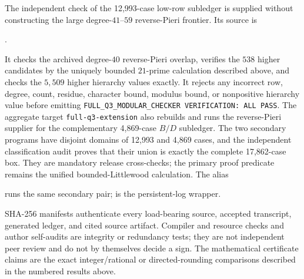 \documentclass[11pt,reqno]{amsart}
\theoremstyle{plain}
\theoremstyle{definition}
\begin{document}
The independent check of the 12,993-case low-row subledger is supplied without
constructing the large
degree-$41$--$59$ reverse-Pieri frontier.  Its source is
\begin{center}
.
\end{center}
It checks the archived degree-$40$ reverse-Pieri overlap, verifies the $538$
higher candidates by the uniquely bounded $21$-prime calculation described
above, and checks the $5{,}509$ higher hierarchy values exactly.  It rejects
any incorrect row, degree, count, residue, character bound, modulus bound, or
nonpositive hierarchy value before emitting
\texttt{FULL\_Q3\_MODULAR\_CHECKER VERIFICATION: ALL PASS}.  The aggregate
target \texttt{full-q3-extension} also rebuilds and runs the reverse-Pieri
supplier for the complementary 4,869-case $B/D$ subledger.  The two secondary
programs have disjoint domains of 12,993 and 4,869 cases, and the independent
classification audit proves that their union is exactly the complete
17,862-case box.  They are mandatory release cross-checks; the primary proof
predicate remains the unified bounded-Littlewood calculation.  The alias
\begin{center}
\end{center}
runs the same secondary pair;
 is the persistent-log wrapper.

SHA-256 manifests authenticate every load-bearing source, accepted
transcript, generated ledger, and cited source artifact.  Compiler and
resource checks and author self-audits are integrity or redundancy tests; they
are not independent peer review and do not by themselves decide a sign.  The
mathematical certificate claims are the exact integer/rational or directed-rounding
comparisons described in the numbered results above.
\end{document}
